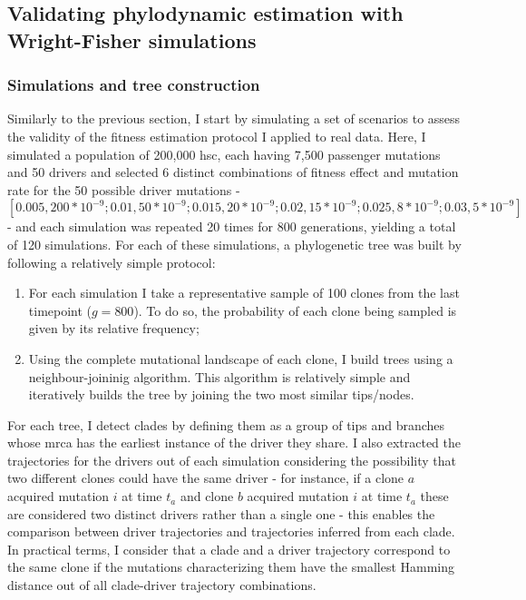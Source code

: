 \subsection{Validating phylodynamic estimation with Wright-Fisher simulations}

\subsubsection{Simulations and tree construction}

Similarly to the previous section, I start by simulating a set of scenarios to assess the validity of the fitness estimation protocol I applied to real data. Here, I simulated a population of 200,000 \ac{hsc}, each having 7,500 passenger mutations and 50 drivers and selected 6 distinct combinations of fitness effect and mutation rate for the 50 possible driver mutations - $[0.005,200*10^{-9}; 0.01,50*10^{-9}; 0.015,20*10^{-9}; 0.02,15*10^{-9}; 0.025,8*10^{-9}; 0.03,5*10^{-9}]$ - and each simulation was repeated 20 times for 800 generations, yielding a total of 120 simulations. For each of these simulations, a phylogenetic tree was built by following a relatively simple protocol:

\begin{enumerate}
    \item For each simulation I take a representative sample of 100 clones from the last timepoint ($g = 800$). To do so, the probability of each clone being sampled is given by its relative frequency;
    \item Using the complete mutational landscape of each clone, I build trees using a neighbour-joininig algorithm. This algorithm is relatively simple and iteratively builds the tree by joining the two most similar tips/nodes. 
\end{enumerate}

For each tree, I detect clades by defining them as a group of tips and branches whose \ac{mrca} has the earliest instance of the driver they share. I also extracted the trajectories for the drivers out of each simulation considering the possibility that two different clones could have the same driver - for instance, if a clone $a$ acquired mutation $i$ at time $t_a$ and clone $b$ acquired mutation $i$ at time $t_a$ these are considered two distinct drivers rather than a single one - this enables the comparison between driver trajectories and trajectories inferred from each clade. In practical terms, I consider that a clade and a driver trajectory correspond to the same clone if the mutations characterizing them have the smallest Hamming distance out of all clade-driver trajectory combinations. 

